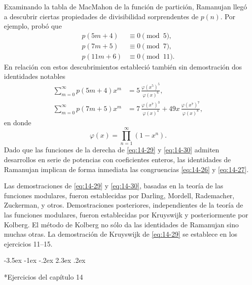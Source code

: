 \documentclass[12pt,a4paper]{book}
\makeatletter
\renewcommand\section{\@startsection{section}{1}{\z@}%
  {-3.5ex \@plus -1ex \@minus -.2ex}%
  {2.3ex \@plus .2ex}%
  {\normalfont\Large\bfseries\raggedright}}
\makeatother
\begin{document}
    Examinando la tabla de MacMahon de la función de partición, Ramanujan llegó a descubrir
    ciertas propiedades de divisibilidad sorprendentes de $p(n)$. Por ejemplo, probó que
    \begin{align}
        p(5m+4)&\equiv0\pmod{5},\label{eq:14-26}\\
        p(7m+5)&\equiv0\pmod{7},\label{eq:14-27}\\
        p(11m+6)&\equiv0\pmod{11}.\label{eq:14-28}
    \end{align}
    En relación con estos descubrimientos estableció también sin demostración dos identidades
    notables
    \begin{align}
        \sum_{m=0}^{\infty}p(5m+4)x^{m}&=5\,\frac{\varphi(x^{5})^{5}}{\varphi(x)^{6}},\label{eq:14-29}\\
        \sum_{m=0}^{\infty}p(7m+5)x^{m}&=7\,\frac{\varphi(x^{7})^{3}}{\varphi(x)^{4}}+49x\,\frac{\varphi(x^{7})^{7}}{\varphi(x)^{8}},\label{eq:14-30}
    \end{align}
    en donde
    \begin{equation*}
        \varphi(x)=\prod_{n=1}^{\infty}(1-x^{n}).
    \end{equation*}
    Dado que las funciones de la derecha de \eqref{eq:14-29} y \eqref{eq:14-30} admiten
    desarrollos en serie de potencias con coeficientes enteros, las identidades de Ramanujan
    implican de forma inmediata las congruencias \eqref{eq:14-26} y \eqref{eq:14-27}.

    Las demostraciones de \eqref{eq:14-29} y \eqref{eq:14-30}, basadas en la teoría de las
    funciones modulares, fueron establecidas por Darling, Mordell, Rademacher, Zuckerman, y
    otros. Demostraciones posteriores, independientes de la teoría de las funciones modulares,
    fueron establecidas por Kruyswijk \cite{kruyswijk1950} y posteriormente por Kolberg. El
    método de Kolberg no sólo da las identidades de Ramanujan sino muchas otras. La
    demostración de Kruyswijk de \eqref{eq:14-29} se establece en los ejercicios 11--15.

    \section*{Ejercicios del capítulo 14}
\end{document}
